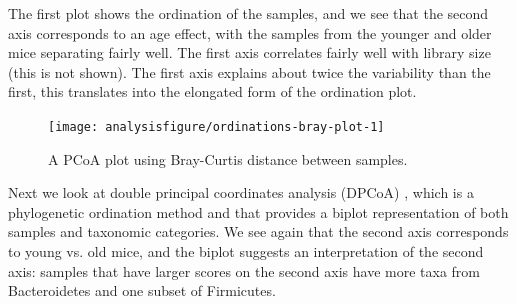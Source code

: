 The first plot shows the ordination of the samples, and we see that
the second axis corresponds to an age effect, with the samples from
the younger and older mice separating fairly well. The first axis
correlates fairly well with library size (this is not shown).
The first axis explains about twice the variability than the first,
this translates into the elongated form of the ordination plot.

\begin{knitrout}
\color{fgcolor}\begin{kframe}
\begin{alltt}
\hlstd{(}\hlstd{(}\hlstd{,} \hlstd{,} \hlstd{,} \hlstd{,} \hlstd{,}
                \hlstd{,} \hlstd{))}
 \hlkwb{<-}   \hlstd{=} \hlstd{,}  \hlstd{=} \hlstd{)}
\end{alltt}
\end{kframe}
\end{knitrout}

\begin{figure}[H]
\begin{knitrout}
\color{fgcolor}\begin{kframe}
\begin{alltt}
 \hlkwb{<-} \hlopt{$}\hlopt{$}
  \hlstd{=} \hlstd{)} \hlopt{+}
  \hlstd{(}\hlstd{(evals[}\hlstd{]} \hlopt{/} \hlstd{evals[}\hlstd{]))} \hlopt{+}
  \hlstd{(} \hlstd{=} \hlstd{)}
\end{alltt}
\end{kframe}

{\centering \texttt{[image: analysisfigure/ordinations-bray-plot-1]} 

}



\end{knitrout}
\caption{A PCoA plot using Bray-Curtis distance between samples.}
\label{fig:ordinations-bray}
\end{figure}

Next we look at double principal coordinates analysis (DPCoA)
\cite{Pavoine:2004,Purdom2010,Fukuyama:2012}, which is a phylogenetic ordination method and
that provides a biplot representation of both samples and taxonomic categories. We see
again that the second axis corresponds to young vs. old
mice, and the biplot suggests an interpretation of the second
axis: samples that have larger scores on the second axis have more
taxa from Bacteroidetes and one subset of Firmicutes.

